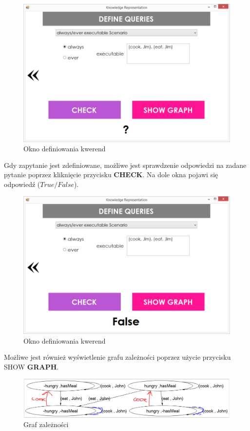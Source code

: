 \documentclass{article}
\begin{document}
\begin{figure}[H]
\centering
\includegraphics[scale=0.4]{11}
\caption{Okno definiowania kwerend}
\end{figure}
\newpage

Gdy zapytanie jest zdefiniowane, możliwe jest sprawdzenie odpowiedzi na zadane pytanie poprzez kliknięcie przycisku \textbf{CHECK}. Na dole okna pojawi się odpowiedź ($True/False$). 

\begin{figure}[H]
\centering
\includegraphics[scale=0.4]{12}
\caption{Okno definiowania kwerend}
\end{figure}

Możliwe jest również wyświetlenie grafu zależności poprzez użycie przycisku SHOW \textbf{GRAPH}. 

\begin{figure}[H]
\centering
\includegraphics[scale=0.4]{13}
\caption{Graf zależności}
\end{figure}
\end{document}
